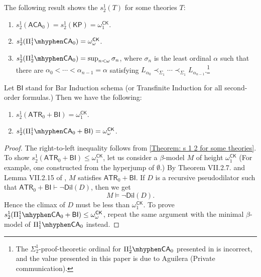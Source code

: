 \documentclass{mhkr}
\newcommand{\Dil}{\mathsf{Dil}}
\newcommand{\CK}{\mathsf{CK}}
\newcommand{\CA}{\mathsf{CA}}
\newcommand{\KP}{\mathsf{KP}}
\newcommand{\ACA}{\mathsf{ACA}}
\newcommand{\ATR}{\mathsf{ATR}}
\newcommand{\BI}{\mathsf{BI}}
\begin{document}
The following result shows the $s^1_2(T)$ for some theories $T$:
\begin{theorem} \phantom{a}
    \pushQED{\qed} \label{Theorem: s 1 2 for some theories}
    \begin{enumerate}
        \item $s^1_2(\ACA_0) = s^1_2(\KP) = \omega_1^\CK$.
        \item $s^1_2(\Pi^1_1\mhyphen \CA_0) = \omega_\omega^\CK$.
        \item $s^1_2(\Pi^1_2\mhyphen \CA_0) = \sup_{n<\omega} \sigma_n$, where $\sigma_n$ is the least ordinal $\alpha$ such that there are $\alpha_0<\cdots<\alpha_{n-1}=\alpha$ satisfying $L_{\alpha_0}\prec_{\Sigma_1}\cdots\prec_{\Sigma_1} L_{\alpha_{n-1}}$.\footnote{The $\Sigma^1_2$-proof-theoretic ordinal for $\Pi^1_2\mhyphen\CA_0$ presented in \cite{AguileraPakhomov2023Pi12} is incorrect, and the value presented in this paper is due to Aguilera (Private communication).}
        \qedhere 
    \end{enumerate}
\end{theorem}
\begin{proposition} \label{Proposition: s 1 2 for bar induction}
    Let $\BI$ stand for Bar Induction schema (or Transfinite Induction for all second-order formulas.) Then we have the following:
    \begin{enumerate}
        \item $s^1_2(\ATR_0 + \BI) = \omega_1^\CK$.
        \item $s^1_2(\Pi^1_1\mhyphen \CA_0 + \BI) = \omega_\omega^\CK$.
    \end{enumerate}
\end{proposition}
\begin{proof}
    The right-to-left inequality follows from \autoref{Theorem: s 1 2 for some theories}. To show $s^1_2(\ATR_0 + \BI) \le \omega_1^\CK$, let us consider a $\beta$-model $M$ of height $\omega_1^\CK$ (For example, one constructed from the hyperjump of $\emptyset$.) By Theorem VII.2.7. and Lemma VII.2.15 of \cite{Simpson2009}, $M$ satisfies $\ATR_0 + \BI$. If $D$ is a recursive pseudodilator such that $\ATR_0 + \BI \vdash \lnot\Dil(D)$, then we get
    \begin{equation*}
        M \vDash \lnot\Dil(D).
    \end{equation*}
    Hence the climax of $D$ must be less than $\omega_1^\CK$. To prove $s^1_2(\Pi^1_1\mhyphen \CA_0 +\BI) \le \omega_\omega^\CK$, repeat the same argument with the minimal $\beta$-model of $\Pi^1_1\mhyphen\CA_0$ instead.
\end{proof}
\end{document}
